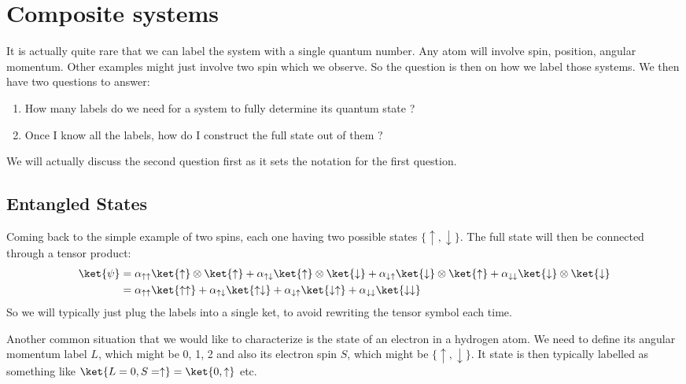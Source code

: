 \section{Composite systems}
It is actually quite rare that we can label the system with a single quantum number. Any atom will involve spin, position, angular momentum. Other examples might just involve two spin which we observe. So the question is then on how we label those systems. We then have two questions to answer:
\begin{enumerate}
\item How many labels do we need for a system to fully determine its quantum state ?
\item Once I know all the labels, how do I construct the full state out of them ?
\end{enumerate}
We will actually discuss the second question first as it sets the notation for the first question.



\subsection{Entangled States}
 
Coming back to the simple example of two spins, each one having two possible states $\{\uparrow, \downarrow\}$. The full state will then be connected through a tensor product:
\begin{align}
\ket{\psi} &= \alpha_{\uparrow\uparrow}\ket{\uparrow}\otimes\ket{\uparrow}+\alpha_{\uparrow\downarrow}\ket{\uparrow}\otimes\ket{\downarrow}+\alpha_{\downarrow\uparrow}\ket{\downarrow}\otimes\ket{\uparrow}+\alpha_{\downarrow\downarrow}\ket{\downarrow}\otimes\ket{\downarrow}\\
&= \alpha_{\uparrow\uparrow}\ket{\uparrow\uparrow}+\alpha_{\uparrow\downarrow}\ket{\uparrow\downarrow}+\alpha_{\downarrow\uparrow}\ket{\downarrow \uparrow}+\alpha_{\downarrow\downarrow}\ket{\downarrow\downarrow}
\end{align}
So we will typically just plug the labels into a single ket, to avoid rewriting the tensor symbol each time. 
					
Another common situation that we would like to characterize is the state of an electron in a hydrogen atom. We need to define its angular momentum label $L$, which might be 0, 1, 2 and also its electron spin $S$, which might be $\{\uparrow, \downarrow\}$. It state is then typically labelled as something like $\ket{L=0, S=\uparrow} = \ket{0,\uparrow}$ etc.

